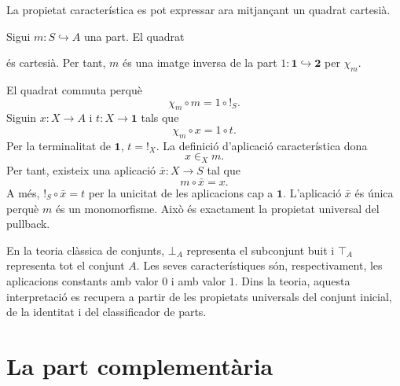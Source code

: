 La propietat característica es pot expressar ara mitjançant un quadrat
cartesià.

\begin{teorema}\label{teo:quadrat-caracteristic}
Sigui \(m:S\hookrightarrow A\) una part. El quadrat
\begin{center}
\end{center}
és cartesià. Per tant, \(m\) és una imatge inversa de la part
\(1:\mathbf1\hookrightarrow\mathbf2\) per \(\chi_m\).
\end{teorema}

\begin{prova}
El quadrat commuta perquè
\[
\chi_m\circ m=1\circ {!}_S.
\]
Siguin \(x:X\to A\) i \(t:X\to\mathbf1\) tals que
\[
\chi_m\circ x=1\circ t.
\]
Per la terminalitat de \(\mathbf1\), \(t={!}_X\). La definició
d'aplicació característica dona
\[
x\in_Xm.
\]
Per tant, existeix una aplicació \(\bar{x}:X\to S\) tal que
\[
m\circ\bar{x}=x.
\]
A més, \({!}_S\circ\bar{x}=t\) per la unicitat de les aplicacions cap
a \(\mathbf1\). L'aplicació \(\bar{x}\) és única perquè \(m\) és un
monomorfisme. Això és exactament la propietat universal del pullback.
\end{prova}

\begin{observacio}\label{obs:parts-extremals-classiques}
En la teoria clàssica de conjunts, \(\bot_A\) representa el subconjunt
buit i \(\top_A\) representa tot el conjunt \(A\). Les seves
característiques són, respectivament, les aplicacions constants amb
valor \(0\) i amb valor \(1\). Dins la teoria, aquesta interpretació es
recupera a partir de les propietats universals del conjunt inicial, de
la identitat i del classificador de parts.
\end{observacio}

\section{La part complementària}\label{sec:complementaria}


